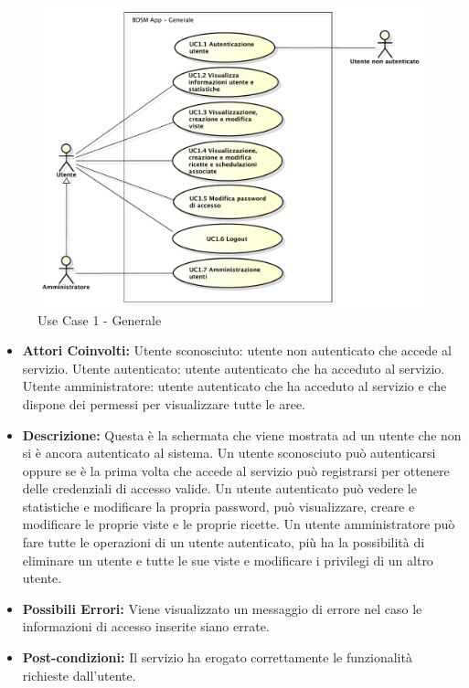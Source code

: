 \begin{figure}[htbp]
    \centering
    \centerline{\includegraphics[scale=0.5]{./images/UC1.pdf}}
    \caption{Use Case 1 - Generale}
\end{figure}

\begin{itemize}

    \item \textbf{Attori Coinvolti:}
    Utente sconosciuto: utente non autenticato che accede al servizio.
    Utente autenticato: utente autenticato che ha acceduto al servizio.
    Utente amministratore: utente autenticato che ha acceduto al servizio e che dispone dei permessi per visualizzare tutte le aree.

    \item \textbf{Descrizione:}
    Questa è la schermata che viene mostrata ad un utente che non si è ancora autenticato al sistema.
    Un utente sconosciuto può autenticarsi oppure se è la prima volta che accede al servizio può registrarsi per ottenere delle credenziali di accesso valide.
    Un utente autenticato può vedere le statistiche e modificare la propria password, può visualizzare, creare e modificare le proprie viste e le proprie ricette.
    Un utente amministratore può fare tutte le operazioni di un utente autenticato, più ha la possibilità di eliminare un utente e tutte le sue viste e modificare i privilegi di un altro utente.

    \item \textbf{Possibili Errori:}
    Viene visualizzato un messaggio di errore nel caso le informazioni di accesso inserite siano errate.

    \item \textbf{Post-condizioni:}
    Il servizio ha erogato correttamente le funzionalità richieste dall'utente.

\end{itemize}

